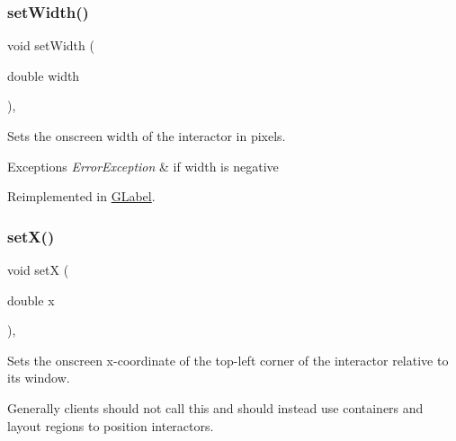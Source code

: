 \mbox{\label{classsgl_1_1GInteractor_aa3f3fba4cb131baa8696ba01e3bceca1}} 
\subsubsection{\texorpdfstring{set\+Width()}{setWidth()}}
{\footnotesize\ttfamily void set\+Width (\begin{DoxyParamCaption}\item[{double}]{width }\end{DoxyParamCaption})\hspace{0.3cm}{\ttfamily [virtual]}, {\ttfamily [inherited]}}



Sets the onscreen width of the interactor in pixels. 


\begin{DoxyExceptions}{Exceptions}
{\em Error\+Exception} & if width is negative \\
\hline
\end{DoxyExceptions}


Reimplemented in \mbox{\hyperlink{classsgl_1_1GLabel_af0c5b6fb4e3c3c9a3fabde548efa93db}{G\+Label}}.

\mbox{\label{classsgl_1_1GInteractor_a9c18fcc579333bf9653d13ad2b372e39}} 
\subsubsection{\texorpdfstring{set\+X()}{setX()}}
{\footnotesize\ttfamily void setX (\begin{DoxyParamCaption}\item[{double}]{x }\end{DoxyParamCaption})\hspace{0.3cm}{\ttfamily [virtual]}, {\ttfamily [inherited]}}



Sets the onscreen x-\/coordinate of the top-\/left corner of the interactor relative to its window. 

Generally clients should not call this and should instead use containers and layout regions to position interactors. 

